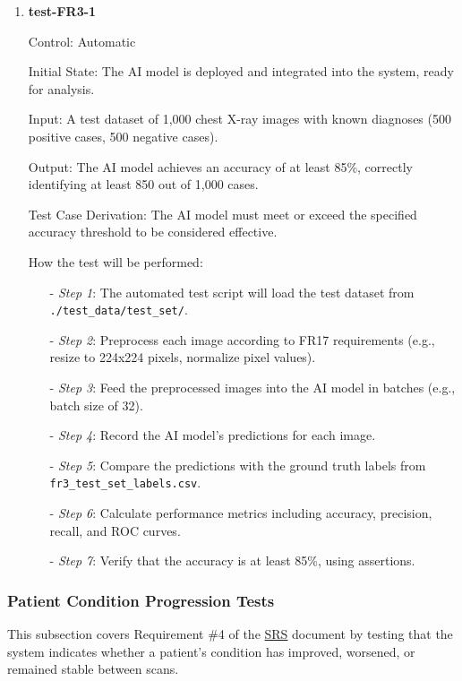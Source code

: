 \documentclass[12pt, titlepage]{article}
\begin{document}
\begin{enumerate}

\item \textbf{test-FR3-1} \label{test-FR3-1}

Control: Automatic

Initial State: The AI model is deployed and integrated into the system, ready for analysis.

Input: A test dataset of 1,000 chest X-ray images with known diagnoses (500 positive cases, 500 negative cases).

Output: The AI model achieves an accuracy of at least 85\%, correctly identifying at least 850 out of 1,000 cases.

Test Case Derivation: The AI model must meet or exceed the specified accuracy threshold to be considered effective.

How the test will be performed:
\begin{itemize}
  \item[-] \textit{Step 1}: The automated test script will load the test dataset from \texttt{./test\_data/test\_set/}.
  \item[-] \textit{Step 2}: Preprocess each image according to FR17 requirements (e.g., resize to 224x224 pixels, normalize pixel values).
  \item[-] \textit{Step 3}: Feed the preprocessed images into the AI model in batches (e.g., batch size of 32).
  \item[-] \textit{Step 4}: Record the AI model's predictions for each image.
  \item[-] \textit{Step 5}: Compare the predictions with the ground truth labels from \texttt{fr3\_test\_set\_labels.csv}.
  \item[-] \textit{Step 6}: Calculate performance metrics including accuracy, precision, recall, and ROC curves.
  \item[-] \textit{Step 7}: Verify that the accuracy is at least 85\%, using assertions.
\end{itemize}

\end{enumerate}

\subsubsection{Patient Condition Progression Tests}

This subsection covers Requirement \#4 of the \href{https://github.com/RezaJodeiri/CXR-Capstone/blob/main/docs/SRS/SRS.pdf}{SRS} \citep{SRS}
document by testing that the system indicates whether a patient's condition has improved, worsened, or remained stable between scans.
\end{document}
